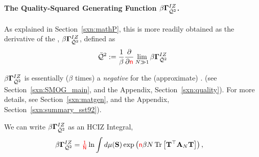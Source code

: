 \paragraph{The Quality-Squared Generating Function $\beta\mathbf{\Gamma}^{IZ}_{\bar{\mathcal{Q}}^{2}}$.}
As explained in Section~\ref{sxn:mathP}, this \QualitySquared is more readily obtained as 
the derivative of the \LayerQualitySquared \GeneratingFunction, $\beta\mathbf{\Gamma}^{IZ}_{\bar{\mathcal{Q}}^{2}}$, defined as
\begin{align}
  \label{eqn:IZG_QT}
  \bar{\mathcal{Q}}^{2} := \dfrac{1}{\beta}\dfrac{\partial }{\partial {\color{red}\sf{n}}} \lim_{N\gg 1}\beta\mathbf{\Gamma}^{IZ}_{\bar{\mathcal{Q}}^{2}}
\end{align}

$\beta\mathbf{\Gamma}^{IZ}_{\bar{\mathcal{Q}}^{2}}$ is essentially ($\beta$ times) a \emph{negative \FreeEnergy} for the (approximate) \LayerQualitySquared.
(see Section~\ref{sxn:SMOG_main}, and the Appendix, Section~\ref{sxn:quality}).
For more details, see Section~\ref{sxn:matgen}, and the Appendix, Section~\ref{sxn:summary_sst92}).

We can write $\beta\mathbf{\Gamma}^{IZ}_{\bar{\mathcal{Q}}^{2}}$ as an HCIZ Integral, 
\begin{align}
  \label{eqn:QT_dS}
  \beta\mathbf{\Gamma}^{IZ}_{\bar{\mathcal{Q}}^{2}}  &= {\color{red}\sf{\tfrac{1}{N}}} \ln\int d\mu(\mathbf{S})\exp\left({\color{red}\sf{n}} \beta N\mbox{}\operatorname{Tr}\left[\mathbf{T}^{\top}\mathbf{A}_N\mathbf{T}\right]\right),
\end{align}

